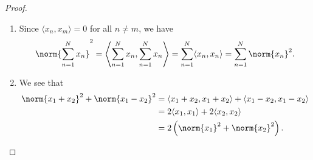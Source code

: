 \documentclass[notoc,notitlepage]{tufte-book}
\begin{document}
\begin{proof}
  \begin{enumerate}
    \item Since $\langle x_n, x_m \rangle = 0$ for all $n \neq m$,
      we have
      \begin{equation*}
        \norm{ \sum_{n=1}^{N} x_n }^2
        = \left\langle \sum_{n=1}^{N} x_n, \sum_{n=1}^{N} x_n \right\rangle
        = \sum_{n=1}^{N} \langle x_n, x_n \rangle
        = \sum_{n=1}^{N} \norm{x_n}^2.
      \end{equation*}

    \item We see that
      \begin{align*}
        \norm{x_1 + x_2}^2 + \norm{x_1 - x_2}^2
        &= \langle x_1 + x_2, x_1 + x_2 \rangle + \langle x_1 - x_2, x_1 - x_2 \rangle \\
        &= 2 \langle x_1, x_1 \rangle + 2 \langle x_2, x_2 \rangle \\
        &= 2 \left( \norm{x_1}^2 + \norm{x_2}^2 \right).
      \end{align*}
  \end{enumerate}
\end{proof}












\appendix

\backmatter

\fancyhead[LE]{\thepage \enspace \textsl{\leftmark}}



\printindex
\end{document}
